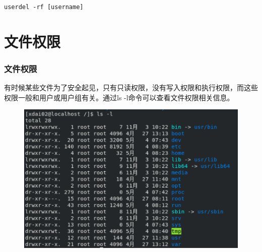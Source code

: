 \documentclass[12pt, openany, oneside]{book}
\begin{document}
\vspace{-0.5cm}

\begin{lstlisting}
userdel -rf [username]
\end{lstlisting}

\begin{table}[H]
    \centering
    \caption{userdel参数说明}
\end{table}

\newpage

\section{文件权限}

\subsubsection{文件权限}

有时候某些文件为了安全起见，只有只读权限，没有写入权限和执行权限，而这些权限一般和用户或用户组有关。通过ls -l命令可以查看文件权限相关信息。

\begin{figure}[H]
    \centering
    \includegraphics[scale=0.7]{img/C5/5-2/1.png}
\end{figure}
\end{document}
